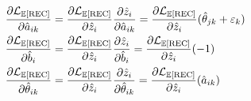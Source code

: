 \documentclass[letterpaper]{article}
\def \e{\ensuremath \varepsilon}
\theoremstyle{definition}
\begin{document}
\begin{align}
  \frac{\partial \mathcal{L}_{\mathbb{E}[\text{REC}]}}{\partial \hat a_{ik}} &= 
  \frac{\partial \mathcal{L}_{\mathbb{E}[\text{REC}]}}{\partial \hat z_i}\frac{\partial \hat z_i}{\partial \hat a_{ik}} = \frac{\partial \mathcal{L}_{\mathbb{E}[\text{REC}]}}{\partial \hat z_i} (\hat \theta_{jk} + \e_k) \\
  \frac{\partial \mathcal{L}_{\mathbb{E}[\text{REC}]}}{\partial \hat b_i} &= 
  \frac{\partial \mathcal{L}_{\mathbb{E}[\text{REC}]}}{\partial \hat z_i}\frac{\partial \hat z_i}{\partial \hat b_i} = \frac{\partial \mathcal{L}_{\mathbb{E}[\text{REC}]}}{\partial \hat z_i} (-1) \\
  \frac{\partial \mathcal{L}_{\mathbb{E}[\text{REC}]}}{\partial \hat \theta_{ik}} &= 
  \frac{\partial \mathcal{L}_{\mathbb{E}[\text{REC}]}}{\partial \hat z_i}\frac{\partial \hat z_i}{\partial \hat \theta_{ik}} = \frac{\partial \mathcal{L}_{\mathbb{E}[\text{REC}]}}{\partial \hat z_i} (\hat a_{ik}) 
 \label{eq:param_deriv}
\end{align}
\end{document}
